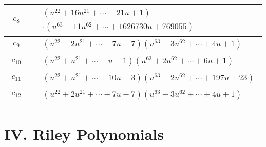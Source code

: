 \documentclass[1p]{elsarticle_modified}
\theoremstyle{definition}
\begin{document}
\begin{tabular}{m{50pt}|m{274pt}}
\hline $$\begin{aligned}c_{8}\end{aligned}$$&$\begin{aligned}
&(u^{22}+16 u^{21}+\cdots-21 u+1)\\
&\cdot(u^{63}+11 u^{62}+\cdots+1626730 u+769055)
\end{aligned}$\\
\hline $$\begin{aligned}c_{9}\end{aligned}$$&$\begin{aligned}
&(u^{22}-2 u^{21}+\cdots-7 u+7)(u^{63}-3 u^{62}+\cdots+4 u+1)
\end{aligned}$\\
\hline $$\begin{aligned}c_{10}\end{aligned}$$&$\begin{aligned}
&(u^{22}+u^{21}+\cdots- u-1)(u^{63}+2 u^{62}+\cdots+6 u+1)
\end{aligned}$\\
\hline $$\begin{aligned}c_{11}\end{aligned}$$&$\begin{aligned}
&(u^{22}+u^{21}+\cdots+10 u-3)(u^{63}-2 u^{62}+\cdots+197 u+23)
\end{aligned}$\\
\hline $$\begin{aligned}c_{12}\end{aligned}$$&$\begin{aligned}
&(u^{22}+2 u^{21}+\cdots+7 u+7)(u^{63}-3 u^{62}+\cdots+4 u+1)
\end{aligned}$\\
\hline
\end{tabular}\newpage\renewcommand{\arraystretch}{1}
\centering \section*{ IV. Riley Polynomials}
\end{document}
